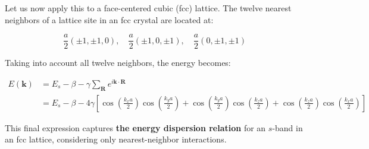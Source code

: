 Let us now apply this to a face-centered cubic (fcc) lattice. The twelve nearest neighbors of a lattice site in an fcc crystal are located at:

\begin{equation*}
	\frac{a}{2} (\pm1, \pm1, 0), \quad \frac{a}{2} (\pm1, 0, \pm1), \quad \frac{a}{2} (0, \pm1, \pm1)
\end{equation*}

Taking into account all twelve neighbors, the energy becomes:

\begin{align*}
	E(\mathbf{k}) & = E_s - \beta - \gamma \sum_{\mathbf{R}} e^{i\mathbf{k} \cdot \mathbf{R}}                                                                                                                                                                                \\
	              & = E_s - \beta - \boxed{4\gamma} \left[ \cos\left(\frac{k_x a}{2}\right) \cos\left(\frac{k_y a}{2}\right) + \cos\left(\frac{k_y a}{2}\right) \cos\left(\frac{k_z a}{2}\right) + \cos\left(\frac{k_z a}{2}\right) \cos\left(\frac{k_x a}{2}\right) \right]
\end{align*}

This final expression captures \textbf{the energy dispersion relation} for an \(s\)-band in an fcc lattice, considering only nearest-neighbor interactions.

